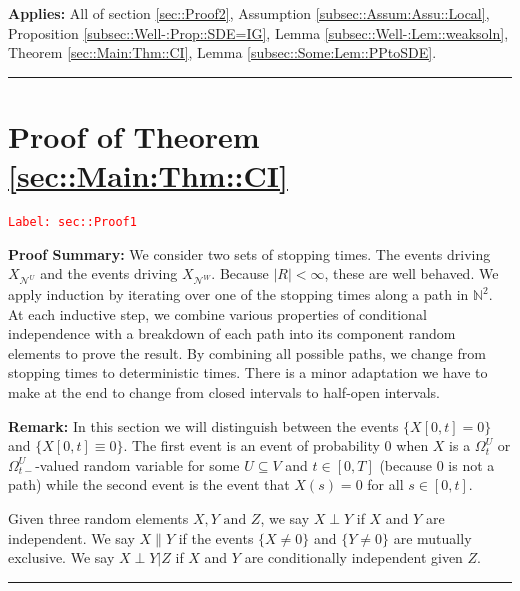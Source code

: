 \documentclass[12pt]{article}
\newcommand{\skipLine}{\vspace{12pt}}
\newcommand{\mb}{\mathbb}
\newcommand{\mc}{\mathcal}
\newcommand{\te}{\text}
\newcommand{\tr}{\textcolor{red}}
\newcommand{\labe}[1]{\tr{\texttt{Label: #1}}}
\newcommand{\pfsum}{\textbf{Proof Summary: }}
\newcommand{\app}{\textbf{Applies: }}
\newcommand{\ind}{\hspace{24pt}}
\newcommand{\lin}{\rule{\linewidth}{0.4 pt}}
\renewcommand{\U}{U}							%
\newcommand{\UU}{W}								%
\newcommand{\UUU}{R}							%
\newcommand{\T}{T}								%
\renewcommand{\t}{t}							%
\newcommand{\sset}{\Omega}						%
\renewcommand{\tt}{s}							%
\newcommand{\X}{X}								%
\newcommand{\neigh}{\mc{N}}						%
\newcommand{\vind}[1]{^{#1}}					%
\newcommand{\vsi}[1]{^{#1}}						%
\newcommand{\cind}[1]{_{#1}}					%
\newcommand{\tp}[1]{(#1)}						%
\newcommand{\tip}[1]{#1}						%
\newcommand{\ts}[1]{_{#1}}						%
\newcommand{\XX}{Y}								%
\newcommand{\XXX}{Z}							%
\newcommand{\mutex}{\|}							%
\begin{document}
\app All of section \ref{sec::Proof2}, Assumption \ref{subsec::Assum:Assu::Local}, Proposition \ref{subsec::Well-:Prop::SDE=IG}, Lemma \ref{subsec::Well-:Lem::weaksoln}, Theorem \ref{sec::Main:Thm::CI}, Lemma \ref{subsec::Some:Lem::PPtoSDE}.

\lin

\section{Proof of Theorem \ref{sec::Main:Thm::CI}}
\label{sec::Proof1}\labe{sec::Proof1}

\pfsum We consider two sets of stopping times. The events driving \(\X\cind{\neigh\vind{\U}}\) and the events driving \(\X\cind{\neigh\vind{\UU}}\). Because \(|\UUU| < \infty\), these are well behaved. We apply induction by iterating over one of the stopping times along a path in \(\mb{N}^2\). At each inductive step, we combine various properties of conditional independence with a breakdown of each path into its component random elements to prove the result. By combining all possible paths, we change from stopping times to deterministic times. There is a minor adaptation we have to make at the end to change from closed intervals to half-open intervals.

\skipLine

\textbf{Remark:} In this section we will distinguish between the events \(\{\X\tip{[0,\t]} = 0\}\) and \(\{\X\tip{[0,\t]}\equiv 0\}\). The first event is an event of probability 0 when \(\X\) is a \(\sset\vsi{\U}\ts{\t}\) or \(\sset\vsi{\U}\ts{\t-}\)-valued random variable for some \(\U\subseteq V\) and \(\t \in [0,\T]\) (because 0 is not a path) while the second event is the event that \(\X\tp{\tt} = 0\) for all \(\tt \in [0,\t]\).

\ind Given three random elements \(\X,\XX \te{ and } \XXX\), we say \(\X\perp \XX\) if \(\X\) and \(\XX\) are independent. We say \(\X\mutex \XX\) if the events \(\{\X\neq 0\}\) and \(\{\XX \neq 0\}\) are mutually exclusive. We say \(\X\perp \XX|\XXX\) if \(\X\) and \(\XX\) are conditionally independent given \(\XXX\).

\lin
\end{document}
